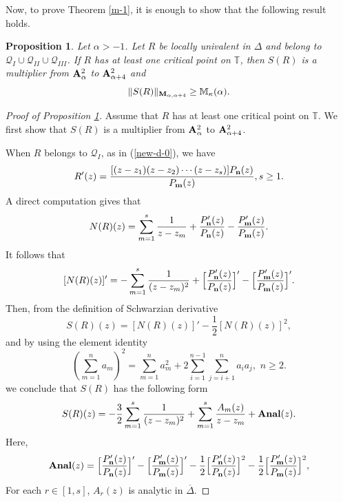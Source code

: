 \documentclass[10pt]{amsart}
\newtheorem{proposition}[theorem]{Proposition}
\theoremstyle{definition}    %
\numberwithin{equation}{section}
\begin{document}
Now, to prove Theorem \ref{m-1}, it is enough to show that the following result holds. 
\begin{proposition}\label{pro}
Let $\alpha>-1$. Let $R$ be locally univalent in $\Delta$ and belong to  $\mathcal{Q}_{I}\cup \mathcal{Q}_{II} \cup \mathcal{Q}_{III}$. If $R$ has at least one critical point on $\mathbb{T}$, then $S(R)$ is a multiplier from ${\bf A}_{\alpha}^2$ to ${\bf A}_{\alpha+4}^2$ and
 $$\|S(R)\|_{{\bf M}_{\alpha, \alpha+4}}\geq \mathbb{M}_{\kappa}(\alpha).$$
\end{proposition}

\begin{proof}[Proof of Proposition \ref{pro}] Assume that $R$ has at least one critical point on $\mathbb{T}$. We first show that $S(R)$ is a multiplier from ${\bf A}_{\alpha}^2$ to ${\bf A}_{\alpha+4}^2$. 

When $R$ belongs to $\mathcal{Q}_{I}$, as in (\ref{new-d-0}), we have 
$$R'(z)=\frac{[(z-z_1)(z-z_2)\cdots(z-z_s)]P_{\bf n}(z)}{P_{\bf m}(z)}, s\geq 1.$$
A direct computation gives that
$$N(R)(z)=\sum_{m=1}^{s}\frac{1}{z-z_m}+\frac{P'_{\bf n}(z)}{P_{\bf n}(z)}-\frac{P'_{\bf m}(z)}{P_{\bf m}(z)}.$$
It follows that
$$[N(R)(z)]'=-\sum_{m=1}^{s}\frac{1}{(z-z_m)^2}+\Big[\frac{P'_{\bf n}(z)}{P_{\bf n}(z)}\Big]'-\Big[\frac{P'_{\bf m}(z)}{P_{\bf m}(z)}\Big]'.$$
Then, from the definition of Schwarzian derivative   
$$S(R)(z)=[N(R)(z)]'-\frac{1}{2}[N(R)(z)]^2,$$ 
and by using the element identity
$$(\sum_{m=1}^{n}a_m)^2=\sum_{m=1}^n {a_m^2}+2\sum_{i=1}^{n-1}\sum_{j=i+1}^n a_{i}a_{j}, \,\, n\geq 2.$$
we conclude that $S(R)$ has the following form
\begin{equation}\label{s-1}
S(R)(z)=-\frac{3}{2}\sum_{m=1}^{s}\frac{1}{(z-z_m)^2}+ \sum_{m=1}^{s}\frac{A_m(z)}{z-z_m}+{\bf Anal}(z).
\end{equation}
Here,  
\begin{equation}\label{anal}
{\bf Anal}(z)=\Big[\frac{P'_{\bf n}(z)}{P_{\bf n}(z)}\Big]'-\Big[\frac{P'_{\bf m}(z)}{P_{\bf m}(z)}\Big]'-\frac{1}{2}\Big[\frac{P'_{\bf n}(z)}{P_{\bf n}(z)}\Big]^2-\frac{1}{2}\Big[\frac{P'_{\bf m}(z)}{P_{\bf m}(z)}\Big]^2,\end{equation}
For each $r\in [1, s]$, $A_r(z)$ is analytic in $\overline{\Delta}$. %


\end{proof}
\end{document}
